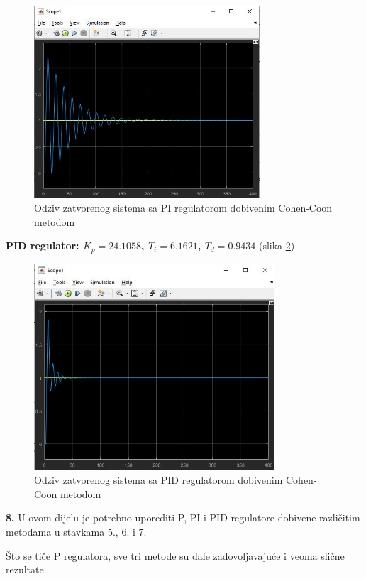 \begin{figure} [H]
  \centering
  \includegraphics[width=0.75\textwidth]{z1_23}
  \caption{Odziv zatvorenog sistema sa PI regulatorom dobivenim Cohen-Coon metodom}
  \label{fig:z1_23}
\end{figure} 

\textbf{PID regulator: $K_p=24.1058$, $T_i=6.1621$, $T_d=0.9434$} (slika \ref{fig:z1_24})

\begin{figure} [H]
  \centering
  \includegraphics[width=0.8\textwidth]{z1_24}
  \caption{Odziv zatvorenog sistema sa PID regulatorom dobivenim Cohen-Coon metodom}
  \label{fig:z1_24}
\end{figure} 
 
\textbf{8.} U ovom dijelu je potrebno uporediti P, PI i PID regulatore dobivene različitim metodama u stavkama 5., 6. i 7. 

Što se tiče P regulatora, sve tri metode su dale zadovoljavajuće i veoma slične rezultate. 

